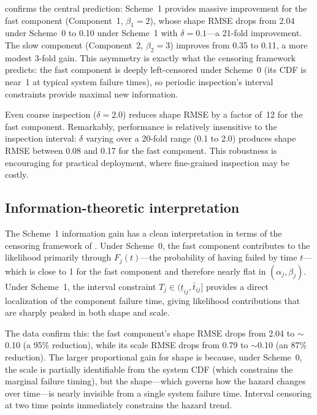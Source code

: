 \documentclass[12pt]{article}
\theoremstyle{definition}
\theoremstyle{remark}
\begin{document}
 confirms the central prediction:
Scheme~1 provides massive improvement for the fast component
(Component~1, $\beta_1 = 2$), whose shape RMSE drops from 2.04
under Scheme~0 to 0.10 under Scheme~1 with $\delta = 0.1$---a
21-fold improvement.  The slow component (Component~2,
$\beta_2 = 3$) improves from 0.35 to 0.11, a more modest
3-fold gain.  This asymmetry is exactly what the censoring
framework predicts: the fast component is deeply left-censored
under Scheme~0 (its CDF is near~1 at typical system failure
times), so periodic inspection's interval constraints provide
maximal new information.

Even coarse inspection ($\delta = 2.0$) reduces shape RMSE by
a factor of~12 for the fast component.  Remarkably, performance
is relatively insensitive to the inspection interval: $\delta$
varying over a 20-fold range (0.1 to 2.0) produces shape RMSE
between 0.08 and 0.17 for the fast component.  This robustness
is encouraging for practical deployment, where fine-grained
inspection may be costly.

\subsection{Information-theoretic interpretation}

The Scheme~1 information gain has a clean interpretation in
terms of the censoring framework of \citet{Towell2026}.  Under
Scheme~0, the fast component contributes to the likelihood
primarily through $F_j(t)$---the probability of having failed by
time $t$---which is close to 1 for the fast component and
therefore nearly flat in $(\alpha_j, \beta_j)$.  Under Scheme~1,
the interval constraint $T_j \in (\underline{t}_{ij},
\bar{t}_{ij}]$ provides a direct localization of the component
failure time, giving likelihood contributions that are sharply
peaked in both shape and scale.

The data confirm this: the fast component's shape RMSE drops from
2.04 to $\sim$0.10 (a 95\% reduction), while its scale RMSE
drops from 0.79 to $\sim$0.10 (an 87\% reduction).  The larger
proportional gain for shape is because, under Scheme~0, the scale
is partially identifiable from the system CDF (which constrains
the marginal failure timing), but the shape---which governs how
the hazard changes over time---is nearly invisible from a single
system failure time.  Interval censoring at two time points
immediately constrains the hazard trend.


\end{document}
